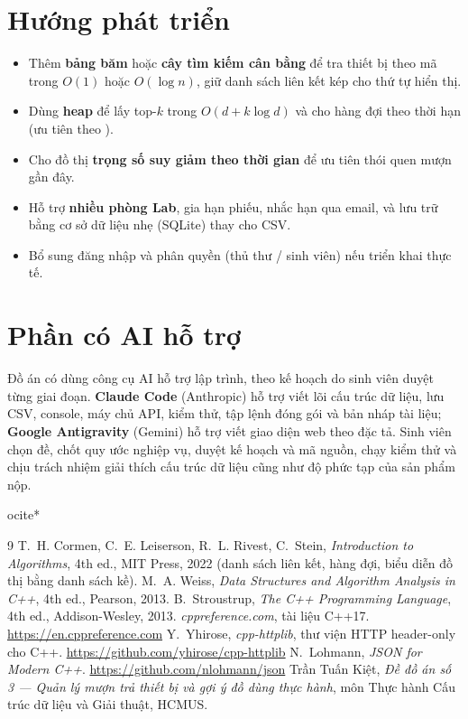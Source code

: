 \section{Hướng phát triển}
\begin{itemize}
  \item Thêm \textbf{bảng băm} hoặc \textbf{cây tìm kiếm cân bằng} để tra thiết bị theo mã trong $O(1)$ hoặc $O(\log n)$, giữ danh sách liên kết kép cho thứ tự hiển thị.
  \item Dùng \textbf{heap} để lấy top-$k$ trong $O(d + k\log d)$ và cho hàng đợi theo thời hạn (ưu tiên theo ).
  \item Cho đồ thị \textbf{trọng số suy giảm theo thời gian} để ưu tiên thói quen mượn gần đây.
  \item Hỗ trợ \textbf{nhiều phòng Lab}, gia hạn phiếu, nhắc hạn qua email, và lưu trữ bằng cơ sở dữ liệu nhẹ (SQLite) thay cho CSV.
  \item Bổ sung đăng nhập và phân quyền (thủ thư / sinh viên) nếu triển khai thực tế.
\end{itemize}

\section*{Phần có AI hỗ trợ}
Đồ án có dùng công cụ AI hỗ trợ lập trình, theo kế hoạch do sinh viên duyệt từng giai đoạn. \textbf{Claude Code} (Anthropic) hỗ trợ viết lõi cấu trúc dữ liệu, lưu CSV, console, máy chủ API, kiểm thử, tập lệnh đóng gói và bản nháp tài liệu; \textbf{Google Antigravity} (Gemini) hỗ trợ viết giao diện web theo đặc tả. Sinh viên chọn đề, chốt quy ước nghiệp vụ, duyệt kế hoạch và mã nguồn, chạy kiểm thử và chịu trách nhiệm giải thích cấu trúc dữ liệu cũng như độ phức tạp của sản phẩm nộp.


ocite{*}
\nocite{*}
\begin{thebibliography}{9}
 T.~H. Cormen, C.~E. Leiserson, R.~L. Rivest, C.~Stein, \emph{Introduction to Algorithms}, 4th ed., MIT Press, 2022 (danh sách liên kết, hàng đợi, biểu diễn đồ thị bằng danh sách kề).
 M.~A. Weiss, \emph{Data Structures and Algorithm Analysis in C++}, 4th ed., Pearson, 2013.
 B.~Stroustrup, \emph{The C++ Programming Language}, 4th ed., Addison-Wesley, 2013.
 \emph{cppreference.com}, tài liệu C++17. \url{https://en.cppreference.com}
 Y.~Yhirose, \emph{cpp-httplib}, thư viện HTTP header-only cho C++. \url{https://github.com/yhirose/cpp-httplib}
 N.~Lohmann, \emph{JSON for Modern C++}. \url{https://github.com/nlohmann/json}
 Trần Tuấn Kiệt, \emph{Đề đồ án số 3 --- Quản lý mượn trả thiết bị và gợi ý đồ dùng thực hành}, môn Thực hành Cấu trúc dữ liệu và Giải thuật, HCMUS.
\end{thebibliography}
